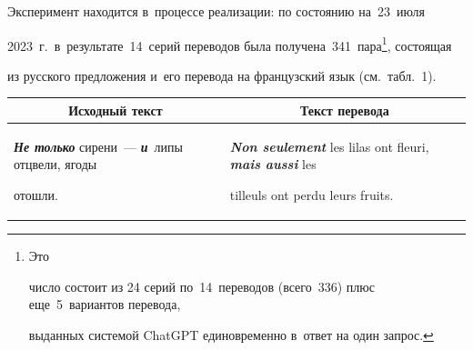    


   Эксперимент находится в~процессе реализации: по со\-сто\-янию на~23~июля 


2023~г.\ в~результате~14~серий переводов была получена~341~пара\footnote{Это 


чис\-ло со\-сто\-ит из 24 серий по~14~переводов (всего~336) плюс еще~5~вариантов перевода, 


выданных сис\-те\-мой \mbox{ChatGPT} единовременно в~ответ на один запрос.}, со\-сто\-ящая 


из русского предложения и~его перевода на французский язык (см.\ табл.~1).





\begin{table}\small %


\begin{center}




\vspace*{2ex}





\tabcolsep=6.5pt


\begin{tabular}{|p{60.5mm}|p{60.5mm}|}


\hline 


\multicolumn{1}{|c|}{\textbf{Исходный текст}}&\multicolumn{1}{c|}{\textbf{Текст перевода}}\\


\hline


{\bfseries\textit{Не только}} сирени~--- {\bfseries\textit{и}}~липы отцвели, ягоды 


отошли.&{\bfseries\textit{Non seulement}} les lilas ont fleuri, {\bfseries\textit{mais aussi}} les 


tilleuls ont perdu leurs fruits.\\


\hline


\end{tabular}


\end{center}


\vspace*{-9pt}


\end{table}


